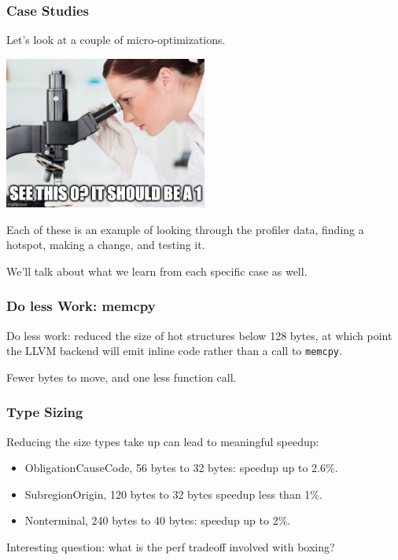 \begin{frame}
\frametitle{Case Studies}

Let's look at a couple of micro-optimizations. 

\begin{center}
	\includegraphics[width=0.5\textwidth]{images/microopt.jpg}
\end{center}

Each of these is an example of looking through
the profiler data, finding a hotspot, making a change, and testing it. 

We'll talk
about what we learn from each specific case as well.

\end{frame}


\begin{frame}
\frametitle{Do less Work: memcpy}

Do less work: reduced the size of hot structures below 128 bytes, at which point the LLVM backend will emit inline code rather than a call to \texttt{memcpy}.


Fewer bytes to move, and one less function call.


\end{frame}


\begin{frame}
\frametitle{Type Sizing}
Reducing the size types take up can lead to meaningful speedup:

\begin{itemize}
\item ObligationCauseCode, 56 bytes to 32 bytes: speedup up to 2.6\%.
\item SubregionOrigin, 120 bytes to 32 bytes speedup less than 1\%.
\item Nonterminal, 240 bytes to 40 bytes: speedup up to 2\%.
\end{itemize}

Interesting question: what is the perf tradeoff involved with boxing?

\end{frame}



